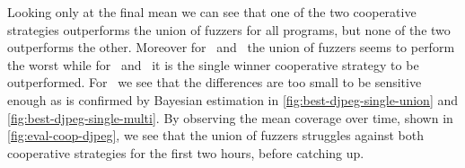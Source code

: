 Looking only at the final mean we can see that one of the two cooperative
strategies outperforms the union of fuzzers for all programs, but none of the
two outperforms the other. Moreover for \djpeg\ and \objdump\ the union of
fuzzers seems to perform the worst while for \tiffpdf\ and \listswf\ it is the
single winner cooperative strategy to be outperformed. For \djpeg\ we see that
the differences are too small to be sensitive enough as is confirmed by Bayesian
estimation in \autoref{fig:best-djpeg-single-union} and
\autoref{fig:best-djpeg-single-multi}. By observing the mean coverage over time,
shown in \autoref{fig:eval-coop-djpeg}, we see that the union of fuzzers
struggles against both cooperative strategies for the first two hours, before
catching up.

\begin{figure}[h]
    \centering%
    \begin{adjustbox}{center}
    \end{adjustbox}
    \begin{adjustbox}{center}
\end{adjustbox}
\end{figure}
